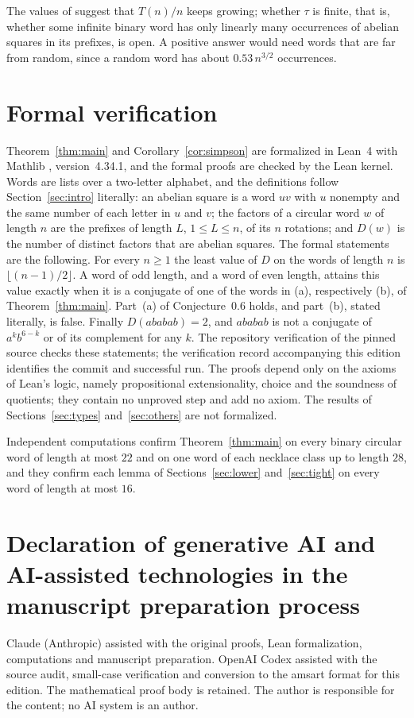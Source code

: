 \documentclass[11pt,reqno]{amsart}
\theoremstyle{definition}
\newcommand{\fl}[1]{\lfloor #1\rfloor}
\begin{document}
The values of \cite{OEIS} suggest that $T(n)/n$ keeps growing; whether $\tau$ is finite, that is, whether some infinite binary word has only linearly many occurrences of abelian squares in its prefixes, is open. A positive answer would need words that are far from random, since a random word has about $0.53\,n^{3/2}$ occurrences.

\section{Formal verification}\label{sec:lean}

Theorem~\ref{thm:main} and Corollary~\ref{cor:simpson} are formalized in Lean~4 \cite{MU21} with Mathlib \cite{Mathlib20}, version~4.34.1, and the formal proofs are checked by the Lean kernel. Words are lists over a two-letter alphabet, and the definitions follow Section~\ref{sec:intro} literally: an abelian square is a word $uv$ with $u$ nonempty and the same number of each letter in $u$ and $v$; the factors of a circular word $w$ of length $n$ are the prefixes of length $L$, $1\le L\le n$, of its $n$ rotations; and $D(w)$ is the number of distinct factors that are abelian squares. The formal statements are the following. For every $n\ge 1$ the least value of $D$ on the words of length $n$ is $\fl{(n-1)/2}$. A word of odd length, and a word of even length, attains this value exactly when it is a conjugate of one of the words in (a), respectively (b), of Theorem~\ref{thm:main}. Part~(a) of Conjecture~0.6 holds, and part~(b), stated literally, is false. Finally $D(ababab)=2$, and $ababab$ is not a conjugate of $a^kb^{6-k}$ or of its complement for any $k$. The repository verification of the pinned source checks these statements; the verification record accompanying this edition identifies the commit and successful run. The proofs depend only on the axioms of Lean's logic, namely propositional extensionality, choice and the soundness of quotients; they contain no unproved step and add no axiom. The results of Sections~\ref{sec:types} and~\ref{sec:others} are not formalized.

Independent computations confirm Theorem~\ref{thm:main} on every binary circular word of length at most $22$ and on one word of each necklace class up to length $28$, and they confirm each lemma of Sections~\ref{sec:lower} and~\ref{sec:tight} on every word of length at most $16$.

\section*{Declaration of generative AI and AI-assisted technologies in the manuscript preparation process}
Claude (Anthropic) assisted with the original proofs, Lean formalization, computations and manuscript preparation. OpenAI Codex assisted with the source audit, small-case verification and conversion to the amsart format for this edition. The mathematical proof body is retained. The author is responsible for the content; no AI system is an author.
\end{document}
